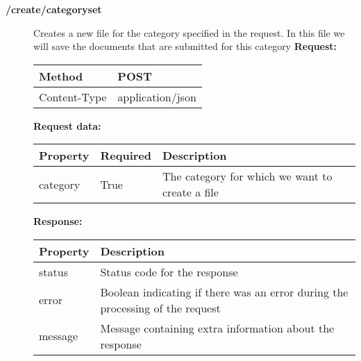 \begin{description}
\item[{\large \textbf{/create/categoryset}}]
Creates a new file for the category specified in the request. In this file we will save the documents that are submitted for this category 
\newline
\newline
\textbf{Request:}
\newline
\newline
\begin{tabular}{ | l | l |}
\hline
Method & POST\\ \hline
Content-Type & application/json\\ \hline
\end{tabular}
\newline
\newline
\textbf{Request data:}
\newline
\newline
\begin{tabular}{ | l | l | l |}
\hline
\textbf{Property} & \textbf{Required} & \textbf{Description}\\ \hline
category & True & The category for which we want to create a file\\ \hline
\end{tabular}
\newline
\newline
\textbf{Response:}
\newline
\newline
\resizebox{\textwidth}{!} {
\begin{tabular}{ | l | l |}
\hline
\textbf{Property} & \textbf{Description}\\ \hline
status & Status code for the response\\ \hline
error & Boolean indicating if there was an error during the processing of the request\\ \hline
message & Message containing extra information about the response\\ \hline
\end{tabular}}



\end{description}

